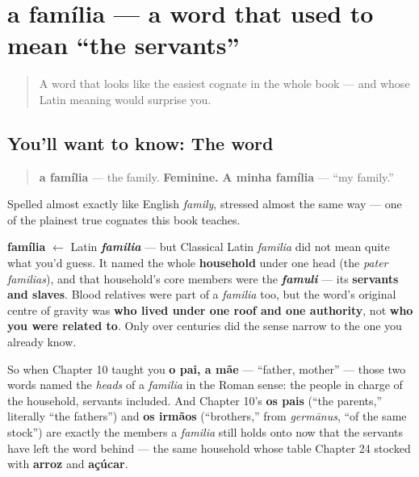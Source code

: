 \section[a família]{a família — a word that used to mean \textquotedblleft{}the servants\textquotedblright{}}

\label{lesson:PT-C25-familia}



\begin{quote}
A word that looks like the easiest cognate in the whole book — and whose Latin meaning would surprise you.
\end{quote}

\subsection*{You'll want to know: The word}
\begin{quote}
\textbf{a família} — the family. \textbf{Feminine.} \textbf{A minha família} — \textquotedblleft{}my family.\textquotedblright{}
\end{quote}

Spelled almost exactly like English \emph{family}, stressed almost the same way — one of the plainest true cognates this book teaches.

\begin{cousinweb}
\textbf{família} $\leftarrow$ Latin \emph{\textbf{familia}} — but Classical Latin \emph{familia} did not mean quite what you'd guess. It named the whole \textbf{household} under one head (the \emph{pater familias}), and that household's core members were the \emph{\textbf{famuli}} — its \textbf{servants and slaves}. Blood relatives were part of a \emph{familia} too, but the word's original centre of gravity was \textbf{who lived under one roof and one authority}, not \textbf{who you were related to}. Only over centuries did the sense narrow to the one you already know.

So when Chapter 10 taught you \textbf{o pai, a mãe} — \textquotedblleft{}father, mother\textquotedblright{} — those two words named the \emph{heads} of a \emph{familia} in the Roman sense: the people in charge of the household, servants included. And Chapter 10's \textbf{os pais} (\textquotedblleft{}the parents,\textquotedblright{} literally \textquotedblleft{}the fathers\textquotedblright{}) and \textbf{os irmãos} (\textquotedblleft{}brothers,\textquotedblright{} from \emph{germānus}, \textquotedblleft{}of the same stock\textquotedblright{}) are exactly the members a \emph{familia} still holds onto now that the servants have left the word behind — the same household whose table Chapter 24 stocked with \textbf{arroz} and \textbf{açúcar}.
\end{cousinweb}

